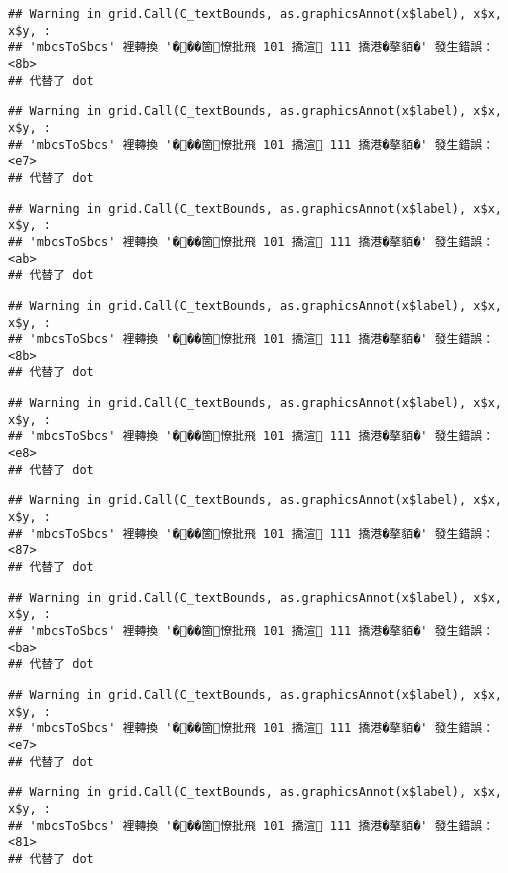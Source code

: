 \documentclass[
]{article}
\begin{document}
\begin{verbatim}
## Warning in grid.Call(C_textBounds, as.graphicsAnnot(x$label), x$x, x$y, :
## 'mbcsToSbcs' 裡轉換 '���箇憭批飛 101 撟渲 111 撟港�摮貊�' 發生錯誤：<8b>
## 代替了 dot
\end{verbatim}

\begin{verbatim}
## Warning in grid.Call(C_textBounds, as.graphicsAnnot(x$label), x$x, x$y, :
## 'mbcsToSbcs' 裡轉換 '���箇憭批飛 101 撟渲 111 撟港�摮貊�' 發生錯誤：<e7>
## 代替了 dot
\end{verbatim}

\begin{verbatim}
## Warning in grid.Call(C_textBounds, as.graphicsAnnot(x$label), x$x, x$y, :
## 'mbcsToSbcs' 裡轉換 '���箇憭批飛 101 撟渲 111 撟港�摮貊�' 發生錯誤：<ab>
## 代替了 dot
\end{verbatim}

\begin{verbatim}
## Warning in grid.Call(C_textBounds, as.graphicsAnnot(x$label), x$x, x$y, :
## 'mbcsToSbcs' 裡轉換 '���箇憭批飛 101 撟渲 111 撟港�摮貊�' 發生錯誤：<8b>
## 代替了 dot
\end{verbatim}

\begin{verbatim}
## Warning in grid.Call(C_textBounds, as.graphicsAnnot(x$label), x$x, x$y, :
## 'mbcsToSbcs' 裡轉換 '���箇憭批飛 101 撟渲 111 撟港�摮貊�' 發生錯誤：<e8>
## 代替了 dot
\end{verbatim}

\begin{verbatim}
## Warning in grid.Call(C_textBounds, as.graphicsAnnot(x$label), x$x, x$y, :
## 'mbcsToSbcs' 裡轉換 '���箇憭批飛 101 撟渲 111 撟港�摮貊�' 發生錯誤：<87>
## 代替了 dot
\end{verbatim}

\begin{verbatim}
## Warning in grid.Call(C_textBounds, as.graphicsAnnot(x$label), x$x, x$y, :
## 'mbcsToSbcs' 裡轉換 '���箇憭批飛 101 撟渲 111 撟港�摮貊�' 發生錯誤：<ba>
## 代替了 dot
\end{verbatim}

\begin{verbatim}
## Warning in grid.Call(C_textBounds, as.graphicsAnnot(x$label), x$x, x$y, :
## 'mbcsToSbcs' 裡轉換 '���箇憭批飛 101 撟渲 111 撟港�摮貊�' 發生錯誤：<e7>
## 代替了 dot
\end{verbatim}

\begin{verbatim}
## Warning in grid.Call(C_textBounds, as.graphicsAnnot(x$label), x$x, x$y, :
## 'mbcsToSbcs' 裡轉換 '���箇憭批飛 101 撟渲 111 撟港�摮貊�' 發生錯誤：<81>
## 代替了 dot
\end{verbatim}
\end{document}
